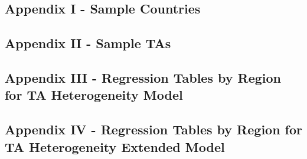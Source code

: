 \documentclass[12pt]{article}%
\begin{document}
\subsection{Appendix I {-} Sample Countries}%
\label{subsec:AppendixI{-}SampleCountries}%


%
\subsection{Appendix II {-} Sample TAs}%
\label{subsec:AppendixII{-}SampleTAs}%


%
\subsection{Appendix III {-} Regression Tables by Region for TA Heterogeneity Model}%
\label{subsec:AppendixIII{-}RegressionTablesbyRegionforTAHeterogeneityModel}%
\FloatBarrier%
%
\FloatBarrier%
%
\FloatBarrier%
%
\FloatBarrier%
%
\FloatBarrier%
%
\FloatBarrier

%
\subsection{Appendix IV {-} Regression Tables by Region for TA Heterogeneity Extended Model}%
\label{subsec:AppendixIV{-}RegressionTablesbyRegionforTAHeterogeneityExtendedModel}%
\FloatBarrier%
%
\FloatBarrier%
%
\FloatBarrier%
%
\FloatBarrier%
%
\FloatBarrier%
%
\FloatBarrier

%
\end{document}
